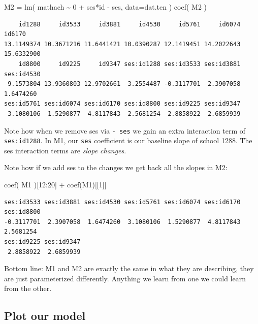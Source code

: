 \documentclass[
  letterpaper,
  DIV=11,
  numbers=noendperiod]{scrreprt}
\newenvironment{Shaded}{\begin{snugshade}}{\end{snugshade}}
\newcommand{\AttributeTok}[1]{\textcolor[rgb]{0.49,0.56,0.16}{#1}}
\newcommand{\DecValTok}[1]{\textcolor[rgb]{0.25,0.63,0.44}{#1}}
\newcommand{\FunctionTok}[1]{\textcolor[rgb]{0.02,0.16,0.49}{#1}}
\newcommand{\NormalTok}[1]{\textcolor[rgb]{0.00,0.44,0.13}{#1}}
\newcommand{\OtherTok}[1]{\textcolor[rgb]{0.00,0.44,0.13}{#1}}
\newcommand{\SpecialCharTok}[1]{\textcolor[rgb]{0.25,0.44,0.63}{#1}}
\begin{document}
\begin{Shaded}
\begin{Highlighting}[]
\NormalTok{M2 }\OtherTok{=} \FunctionTok{lm}\NormalTok{( mathach }\SpecialCharTok{\textasciitilde{}} \DecValTok{0} \SpecialCharTok{+}\NormalTok{ ses}\SpecialCharTok{*}\NormalTok{id }\SpecialCharTok{{-}}\NormalTok{ ses, }\AttributeTok{data=}\NormalTok{dat.ten )}
\FunctionTok{coef}\NormalTok{( M2 )}
\end{Highlighting}
\end{Shaded}

\begin{verbatim}
    id1288     id3533     id3881     id4530     id5761     id6074     id6170 
13.1149374 10.3671216 11.6441421 10.0390287 12.1419451 14.2022643 15.6332900 
    id8800     id9225     id9347 ses:id1288 ses:id3533 ses:id3881 ses:id4530 
 9.1573804 13.9360803 12.9702661  3.2554487 -0.3117701  2.3907058  1.6474260 
ses:id5761 ses:id6074 ses:id6170 ses:id8800 ses:id9225 ses:id9347 
 3.1080106  1.5290877  4.8117843  2.5681254  2.8858922  2.6859939 
\end{verbatim}

Note how when we remove ses via \texttt{-\ ses} we gain an extra
interaction term of \texttt{ses:id1288}. In M1, our \texttt{ses}
coefficient is our baseline slope of school 1288. The ses interaction
terms are \emph{slope changes}.

Note how if we add ses to the changes we get back all the slopes in M2:

\begin{Shaded}
\begin{Highlighting}[]
\FunctionTok{coef}\NormalTok{( M1 )[}\DecValTok{12}\SpecialCharTok{:}\DecValTok{20}\NormalTok{] }\SpecialCharTok{+} \FunctionTok{coef}\NormalTok{(M1)[[}\DecValTok{1}\NormalTok{]]}
\end{Highlighting}
\end{Shaded}

\begin{verbatim}
ses:id3533 ses:id3881 ses:id4530 ses:id5761 ses:id6074 ses:id6170 ses:id8800 
-0.3117701  2.3907058  1.6474260  3.1080106  1.5290877  4.8117843  2.5681254 
ses:id9225 ses:id9347 
 2.8858922  2.6859939 
\end{verbatim}

Bottom line: M1 and M2 are exactly the same in what they are describing,
they are just parameterized differently. Anything we learn from one we
could learn from the other.

\hypertarget{plot-our-model}{%
\subsection{Plot our model}\label{plot-our-model}}
\end{document}
